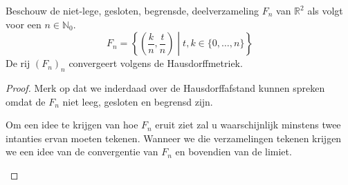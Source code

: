 \documentclass[main.tex]{subfiles}
\begin{document}
\begin{vb}
  Beschouw de niet-lege, gesloten, begrensde, deelverzameling $F_{n}$ van $\mathbb{R}^{2}$ als volgt voor een $n\in \mathbb{N}_{0}$.
  \[ F_{n} = \left\{ \left(\frac{k}{n},\frac{t}{n}\right) \middle| t,k \in \{0,\dotsc,n\} \right\} \]
  De rij $(F_{n})_{n}$ convergeert volgens de Hausdorffmetriek.

  \begin{proof}
    Merk op dat we inderdaad over de Hausdorffafstand kunnen spreken omdat de $F_{n}$ niet leeg, gesloten en begrensd zijn.
    \begin{klad}
      Om een idee te krijgen van hoe $F_{n}$ eruit ziet zal u waarschijnlijk minstens twee intanties ervan moeten tekenen.
      Wanneer we die verzamelingen tekenen krijgen we een idee van de convergentie van $F_{n}$ en bovendien van de limiet.


\end{klad}
\end{proof}
\end{vb}
\end{document}
